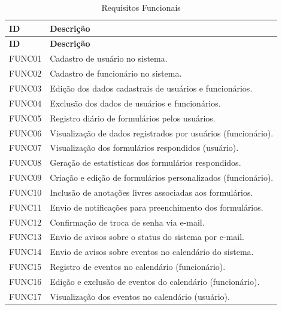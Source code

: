 \begin{center}
\begin{longtable}{|>{\raggedright\arraybackslash}p{2cm}|p{13cm}|}
\caption{Requisitos Funcionais} \label{tab:requisitosfunc} \\
\hline
\textbf{ID} & \textbf{Descrição} \\
\hline
\endfirsthead

\hline
\textbf{ID} & \textbf{Descrição} \\
\hline
\endhead

        FUNC01 & Cadastro de usuário no sistema. \\
        \hline
        FUNC02 & Cadastro de funcionário no sistema. \\
        \hline
        FUNC03 & Edição dos dados cadastrais de usuários e funcionários. \\
        \hline
        FUNC04 & Exclusão dos dados de usuários e funcionários. \\
        \hline
        FUNC05 & Registro diário de formulários pelos usuários. \\
        \hline
        FUNC06 & Visualização de dados registrados por usuários (funcionário). \\
        \hline
        FUNC07 & Visualização dos formulários respondidos (usuário). \\
        \hline
        FUNC08 & Geração de estatísticas dos formulários respondidos. \\
        \hline
        FUNC09 & Criação e edição de formulários personalizados (funcionário). \\
        \hline
        FUNC10 & Inclusão de anotações livres associadas aos formulários. \\
        \hline
        FUNC11 & Envio de notificações para preenchimento dos formulários. \\
        \hline
        FUNC12 & Confirmação de troca de senha via e-mail. \\
        \hline
        FUNC13 & Envio de avisos sobre o status do sistema por e-mail. \\
        \hline
        FUNC14 & Envio de avisos sobre eventos no calendário do sistema. \\
        \hline
        FUNC15 & Registro de eventos no calendário (funcionário). \\
        \hline
        FUNC16 & Edição e exclusão de eventos do calendário (funcionário). \\
        \hline
        FUNC17 & Visualização dos eventos no calendário (usuário). \\

\end{longtable}
\end{center}
